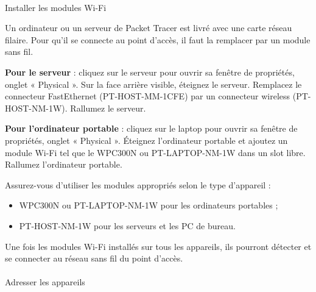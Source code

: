 \documentclass[
  french,
  10pt,
  a4paper,
]{scrartcl}
\makeatletter
\let\oldparagraph\paragraph
\renewcommand{\paragraph}{
    \@ifstar
      \xxxParagraphStar
      \xxxParagraphNoStar
  }
\newcommand{\xxxParagraphStar}[1]{\oldparagraph*{#1}\mbox{}}
\newcommand{\xxxParagraphNoStar}[1]{\oldparagraph{#1}\mbox{}}
\providecommand{\tightlist}{%
  \setlength{\itemsep}{0pt}\setlength{\parskip}{0pt}}
\makeatother
\begin{document}
\paragraph{Installer les modules
Wi-Fi}\label{installer-les-modules-wi-fi}

Un ordinateur ou un serveur de Packet Tracer est livré avec une carte
réseau filaire. Pour qu'il se connecte au point d'accès, il faut la
remplacer par un module sans fil.

\textbf{Pour le serveur} : cliquez sur le serveur pour ouvrir sa fenêtre
de propriétés, onglet « Physical ». Sur la face arrière visible,
éteignez le serveur. Remplacez le connecteur FastEthernet
(PT-HOST-MM-1CFE) par un connecteur wireless (PT-HOST-NM-1W). Rallumez
le serveur.

\textbf{Pour l'ordinateur portable} : cliquez sur le laptop pour ouvrir
sa fenêtre de propriétés, onglet « Physical ». Éteignez l'ordinateur
portable et ajoutez un module Wi-Fi tel que le WPC300N ou
PT-LAPTOP-NM-1W dans un slot libre. Rallumez l'ordinateur portable.

\begin{tcolorbox}[enhanced jigsaw, arc=.35mm, bottomrule=.15mm, bottomtitle=1mm, breakable, colback=white, colbacktitle=quarto-callout-important-color!10!white, colframe=quarto-callout-important-color-frame, coltitle=black, left=2mm, leftrule=.75mm, opacityback=0, opacitybacktitle=0.6, rightrule=.15mm, title=\textcolor{quarto-callout-important-color}{\faExclamation}\hspace{0.5em}{Choisir le bon module}, titlerule=0mm, toprule=.15mm, toptitle=1mm]

Assurez-vous d'utiliser les modules appropriés selon le type d'appareil
:

\begin{itemize}
\tightlist
\item
  WPC300N ou PT-LAPTOP-NM-1W pour les ordinateurs portables ;
\item
  PT-HOST-NM-1W pour les serveurs et les PC de bureau.
\end{itemize}

\end{tcolorbox}

Une fois les modules Wi-Fi installés sur tous les appareils, ils
pourront détecter et se connecter au réseau sans fil du point d'accès.

\paragraph{Adresser les appareils}\label{adresser-les-appareils}
\end{document}
